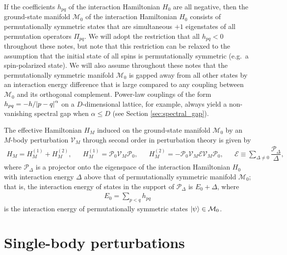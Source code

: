 \documentclass[nofootinbib,notitlepage,11pt]{revtex4-2}
\newcommand{\f}[2]{\dfrac{#1}{#2}} %
\newcommand{\1}{\mathds{1}}
\newcommand{\E}{\mathcal{E}}
\newcommand{\M}{\mathcal{M}}
\renewcommand{\P}{\mathcal{P}}
\newcommand{\V}{\mathcal{V}}
\begin{document}
If the coefficients $h_{pq}$ of the interaction Hamiltonian $H_0$ are
all negative, then the ground-state manifold $\M_0$ of the interaction
Hamiltonian $H_0$ consists of permutationally symmetric states that
are simultaneous $+1$ eigenstates of all permutation operators
$\Pi_{pq}$.  We will adopt the restriction that all $h_{pq}<0$
throughout these notes, but note that this restriction can be relaxed
to the assumption that the initial state of all spins is
permutationally symmetric (e.g.~a spin-polarized state).  We will also
assume throughout these notes that the permutationally symmetric
manifold $\M_0$ is gapped away from all other states by an interaction
energy difference that is large compared to any coupling between
$\M_0$ and its orthogonal complement.  Power-law couplings of the form
$h_{pq}=-h/\abs{p-q}^\alpha$ on a $D$-dimensional lattice, for
example, always yield a non-vanishing spectral gap when $\alpha\le D$
(see Section \ref{sec:spectral_gap}).

The effective Hamiltonian $H_M$ induced on the ground-state manifold
$\M_0$ by an $M$-body perturbation $\V_M$ through second order in
perturbation theory is given by\cite{bravyi2011schrieffer,
  perlin2019effective}
\begin{align}
  H_M = H_M^{(1)} + H_M^{(2)},
  &&
  H_M^{(1)} = \P_0 \V_M \P_0,
  &&
  H_M^{(2)} = - \P_0 \V_M \E \V_M \P_0,
  &&
  \E \equiv \sum_{\Delta\ne0} \f{\P_\Delta}{\Delta},
  \label{eq:H_M}
\end{align}
where $\P_\Delta$ is a projector onto the eigenspace of the
interaction Hamiltonian $H_0$ with interaction energy $\Delta$ above
that of permutationally symmetric manifold $\M_0$; that is, the
interaction energy of states in the support of $\P_\Delta$ is
$E_0+\Delta$, where
\begin{align}
  E_0 = \sum_{p<q} h_{pq}
\end{align}
is the interaction energy of permutationally symmetric states
$\ket\psi\in\M_0$.

\section{Single-body perturbations}
\label{sec:single_body_pert}
\end{document}

